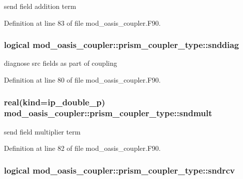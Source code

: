 send field addition term 



Definition at line 83 of file mod\+\_\+oasis\+\_\+coupler.\+F90.

\hypertarget{structmod__oasis__coupler_1_1prism__coupler__type_ae0ad5bd2dfbc17cbdceeda23c92dbebe}{
\subsubsection[{snddiag}]{\setlength{\rightskip}{0pt plus 5cm}logical mod\+\_\+oasis\+\_\+coupler\+::prism\+\_\+coupler\+\_\+type\+::snddiag\hspace{0.3cm}{\ttfamily [private]}}}\label{structmod__oasis__coupler_1_1prism__coupler__type_ae0ad5bd2dfbc17cbdceeda23c92dbebe}


diagnose src fields as part of coupling 



Definition at line 80 of file mod\+\_\+oasis\+\_\+coupler.\+F90.

\hypertarget{structmod__oasis__coupler_1_1prism__coupler__type_ad17bb1c791d2ef48cf7b4abf955bf43b}{
\subsubsection[{sndmult}]{\setlength{\rightskip}{0pt plus 5cm}real(kind=ip\+\_\+double\+\_\+p) mod\+\_\+oasis\+\_\+coupler\+::prism\+\_\+coupler\+\_\+type\+::sndmult\hspace{0.3cm}{\ttfamily [private]}}}\label{structmod__oasis__coupler_1_1prism__coupler__type_ad17bb1c791d2ef48cf7b4abf955bf43b}


send field multiplier term 



Definition at line 82 of file mod\+\_\+oasis\+\_\+coupler.\+F90.

\hypertarget{structmod__oasis__coupler_1_1prism__coupler__type_a45db2da67a23b8a4b693d0b7882996b5}{
\subsubsection[{sndrcv}]{\setlength{\rightskip}{0pt plus 5cm}logical mod\+\_\+oasis\+\_\+coupler\+::prism\+\_\+coupler\+\_\+type\+::sndrcv\hspace{0.3cm}{\ttfamily [private]}}}\label{structmod__oasis__coupler_1_1prism__coupler__type_a45db2da67a23b8a4b693d0b7882996b5}


